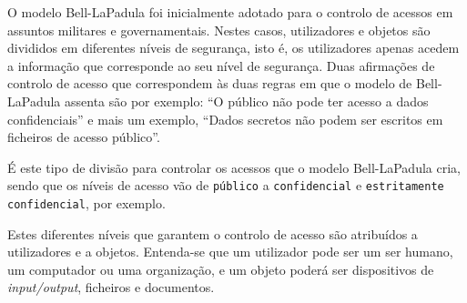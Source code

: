 \documentclass[../tp2.tex]{subfiles}
\begin{document}
O modelo Bell-LaPadula foi inicialmente adotado para o controlo de acessos em assuntos militares e governamentais. Nestes casos, utilizadores e objetos são divididos em diferentes níveis de segurança, isto é, os utilizadores apenas acedem a informação que corresponde ao seu nível de segurança. Duas afirmações de controlo de acesso que correspondem às duas regras em que o modelo de Bell-LaPadula assenta são por exemplo: ``O público não pode ter acesso a dados confidenciais'' e mais um exemplo, ``Dados secretos não podem ser escritos em ficheiros de acesso público''.\par 
É este tipo de divisão para controlar os acessos que o modelo Bell-LaPadula cria, sendo que os níveis de acesso vão de \texttt{público} a \texttt{confidencial} e \texttt{estritamente confidencial}, por exemplo.\par 
Estes diferentes níveis que garantem o controlo de acesso são atribuídos a utilizadores e a objetos. Entenda-se que um utilizador pode ser um ser humano, um computador ou uma organização, e um objeto poderá ser dispositivos de \textit{input/output}, ficheiros e documentos.
\end{document}
